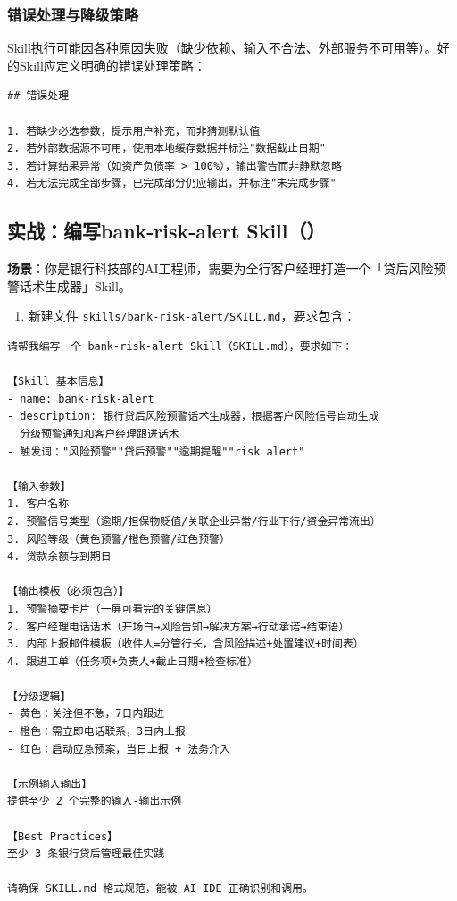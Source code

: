 \subsubsection{错误处理与降级策略}

Skill执行可能因各种原因失败（缺少依赖、输入不合法、外部服务不可用等）。好的Skill应定义明确的错误处理策略：

\begin{lstlisting}
## 错误处理

1. 若缺少必选参数，提示用户补充，而非猜测默认值
2. 若外部数据源不可用，使用本地缓存数据并标注"数据截止日期"
3. 若计算结果异常（如资产负债率 > 100%），输出警告而非静默忽略
4. 若无法完成全部步骤，已完成部分仍应输出，并标注"未完成步骤"
\end{lstlisting}

\subsection{实战：编写bank-risk-alert Skill（）}

\textbf{场景}：你是银行科技部的AI工程师，需要为全行客户经理打造一个「贷后风险预警话术生成器」Skill。

\begin{enumerate}[leftmargin=2em]
  \item 新建文件 \texttt{skills/bank-risk-alert/SKILL.md}，要求包含：
\end{enumerate}

\begin{lstlisting}
请帮我编写一个 bank-risk-alert Skill（SKILL.md），要求如下：

【Skill 基本信息】
- name: bank-risk-alert
- description: 银行贷后风险预警话术生成器，根据客户风险信号自动生成
  分级预警通知和客户经理跟进话术
- 触发词："风险预警""贷后预警""逾期提醒""risk alert"

【输入参数】
1. 客户名称
2. 预警信号类型（逾期/担保物贬值/关联企业异常/行业下行/资金异常流出）
3. 风险等级（黄色预警/橙色预警/红色预警）
4. 贷款余额与到期日

【输出模板（必须包含）】
1. 预警摘要卡片（一屏可看完的关键信息）
2. 客户经理电话话术（开场白→风险告知→解决方案→行动承诺→结束语）
3. 内部上报邮件模板（收件人=分管行长，含风险描述+处置建议+时间表）
4. 跟进工单（任务项+负责人+截止日期+检查标准）

【分级逻辑】
- 黄色：关注但不急，7日内跟进
- 橙色：需立即电话联系，3日内上报
- 红色：启动应急预案，当日上报 + 法务介入

【示例输入输出】
提供至少 2 个完整的输入-输出示例

【Best Practices】
至少 3 条银行贷后管理最佳实践

请确保 SKILL.md 格式规范，能被 AI IDE 正确识别和调用。
\end{lstlisting}

